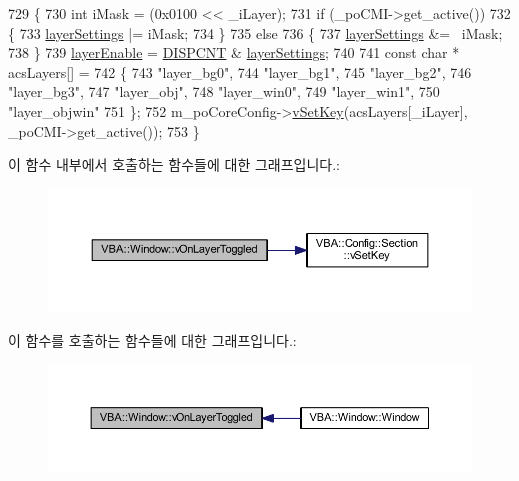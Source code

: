 \begin{DoxyCode}
729 \{
730   \textcolor{keywordtype}{int} iMask = (0x0100 << \_iLayer);
731   \textcolor{keywordflow}{if} (\_poCMI->get\_active())
732   \{
733     \mbox{\hyperlink{_globals_8cpp_aab45842fd405c5c9c24494c026a4441f}{layerSettings}} |= iMask;
734   \}
735   \textcolor{keywordflow}{else}
736   \{
737     \mbox{\hyperlink{_globals_8cpp_aab45842fd405c5c9c24494c026a4441f}{layerSettings}} &= ~iMask;
738   \}
739   \mbox{\hyperlink{_globals_8cpp_ae500546b58e29b2979143341072dfe7b}{layerEnable}} = \mbox{\hyperlink{_globals_8cpp_a843ca20ea4281609edb7d32392e31de8}{DISPCNT}} & \mbox{\hyperlink{_globals_8cpp_aab45842fd405c5c9c24494c026a4441f}{layerSettings}};
740 
741   \textcolor{keyword}{const} \textcolor{keywordtype}{char} * acsLayers[] =
742   \{
743     \textcolor{stringliteral}{"layer\_bg0"},
744     \textcolor{stringliteral}{"layer\_bg1"},
745     \textcolor{stringliteral}{"layer\_bg2"},
746     \textcolor{stringliteral}{"layer\_bg3"},
747     \textcolor{stringliteral}{"layer\_obj"},
748     \textcolor{stringliteral}{"layer\_win0"},
749     \textcolor{stringliteral}{"layer\_win1"},
750     \textcolor{stringliteral}{"layer\_objwin"}
751   \};
752   m\_poCoreConfig->\mbox{\hyperlink{class_v_b_a_1_1_config_1_1_section_a57e1b95cbea40db71c093381beff4b0e}{vSetKey}}(acsLayers[\_iLayer], \_poCMI->get\_active());
753 \}
\end{DoxyCode}
이 함수 내부에서 호출하는 함수들에 대한 그래프입니다.\+:
\nopagebreak
\begin{figure}[H]
\begin{center}
\leavevmode
\includegraphics[width=350pt]{class_v_b_a_1_1_window_aabcf3fafc945b040ac1f775cb32a7245_cgraph}
\end{center}
\end{figure}
이 함수를 호출하는 함수들에 대한 그래프입니다.\+:
\nopagebreak
\begin{figure}[H]
\begin{center}
\leavevmode
\includegraphics[width=350pt]{class_v_b_a_1_1_window_aabcf3fafc945b040ac1f775cb32a7245_icgraph}
\end{center}
\end{figure}
\mbox{\label{class_v_b_a_1_1_window_a18461a94955930d3e10fdb093322d7a9}} 
